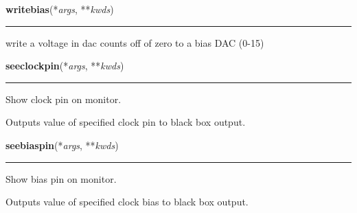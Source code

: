    \label{dsp:writebias}

    \vspace{0.5ex}

    \begin{boxedminipage}{\textwidth}

    \raggedright \textbf{writebias}(*\textit{args}, **\textit{kwds})

    \vspace{-1.5ex}

    \rule{\textwidth}{0.5\fboxrule}
    write a voltage in dac counts off of zero to a bias DAC (0-15)

    \vspace{1ex}

    \end{boxedminipage}

    \label{dsp:seeclockpin}

    \vspace{0.5ex}

    \begin{boxedminipage}{\textwidth}

    \raggedright \textbf{seeclockpin}(*\textit{args}, **\textit{kwds})

    \vspace{-1.5ex}

    \rule{\textwidth}{0.5\fboxrule}
    Show clock pin on monitor.

    Outputs value of specified clock pin to black box output.

    \vspace{1ex}

    \end{boxedminipage}

    \label{dsp:seebiaspin}

    \vspace{0.5ex}

    \begin{boxedminipage}{\textwidth}

    \raggedright \textbf{seebiaspin}(*\textit{args}, **\textit{kwds})

    \vspace{-1.5ex}

    \rule{\textwidth}{0.5\fboxrule}
    Show bias pin on monitor.

    Outputs value of specified clock bias to black box output.

    \vspace{1ex}

    \end{boxedminipage}


